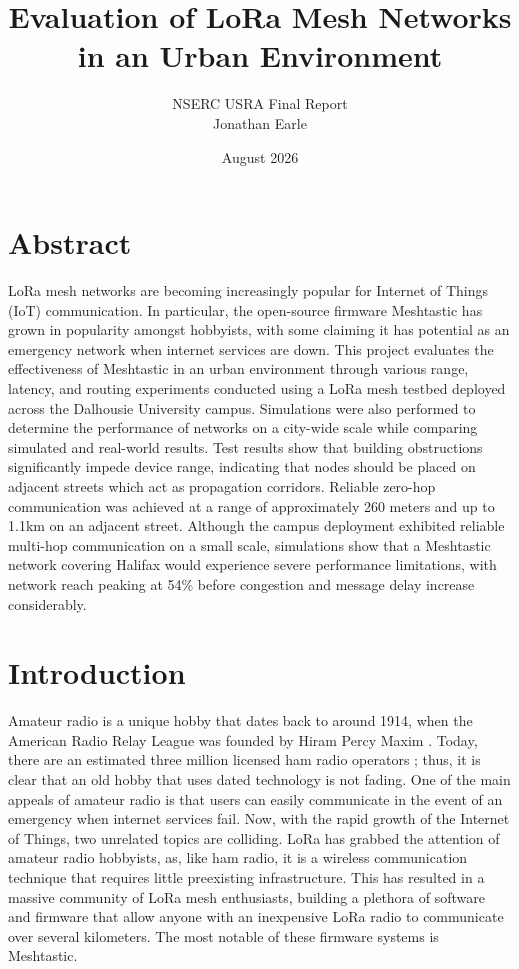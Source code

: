 \documentclass[11pt]{article}
\title{Evaluation of LoRa Mesh Networks in an Urban Environment}
\author{
NSERC USRA Final Report\\
Jonathan Earle\\
}
\date{August 2026}
\begin{document}
\maketitle

\section{Abstract}

LoRa mesh networks are becoming increasingly popular for Internet of Things (IoT) communication. In particular, the open-source firmware Meshtastic has grown in popularity amongst hobbyists, with some claiming it has potential as an emergency network when internet services are down. This project evaluates the effectiveness of Meshtastic in an urban environment through various range, latency, and routing experiments conducted using a LoRa mesh testbed deployed across the Dalhousie University campus. Simulations were also performed to determine the performance of networks on a city-wide scale while comparing simulated and real-world results. Test results show that building obstructions significantly impede device range, indicating that nodes should be placed on adjacent streets which act as propagation corridors. Reliable zero-hop communication was achieved at a range of approximately 260 meters and up to 1.1km on an adjacent street. Although the campus deployment exhibited reliable multi-hop communication on a small scale, simulations show that a Meshtastic network covering Halifax would experience severe performance limitations, with network reach peaking at 54\% before congestion and message delay increase considerably.

\section{Introduction}

Amateur radio is a unique hobby that dates back to around 1914, when the American Radio Relay League was founded by Hiram Percy Maxim \cite{the_national_association_for_amateur_radio_ham_nodate}. Today, there are an estimated three million licensed ham radio operators \cite{clash_ham_nodate}; thus, it is clear that an old hobby that uses dated technology is not fading. One of the main appeals of amateur radio is that users can easily communicate in the event of an emergency when internet services fail. Now, with the rapid growth of the Internet of Things, two unrelated topics are colliding. LoRa has grabbed the attention of amateur radio hobbyists, as, like ham radio, it is a wireless communication technique that requires little preexisting infrastructure. This has resulted in a massive community of LoRa mesh enthusiasts, building a plethora of software and firmware that allow anyone with an inexpensive LoRa radio to communicate over several kilometers. The most notable of these firmware systems is Meshtastic.
\end{document}
